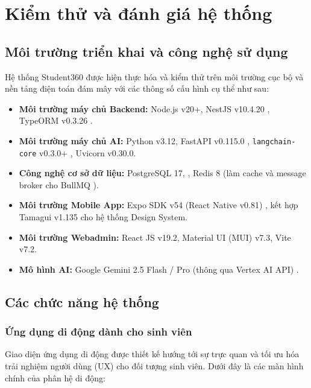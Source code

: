 \chapter{Kiểm thử và đánh giá hệ thống}
\label{ch:hien-thuc-kiem-thu-danh-gia}
\section{Môi trường triển khai và công nghệ sử dụng}
Hệ thống Student360 được hiện thực hóa và kiểm thử trên môi trường cục bộ và nền tảng điện toán đám mây với các thông số cấu hình cụ thể như sau:
\begin{sloppypar}
\begin{itemize}
    \item \textbf{Môi trường máy chủ Backend:} Node.js v20+, NestJS v10.4.20 \cite{nestjs-docs}, TypeORM v0.3.26 \cite{typeorm-docs}.
    \item \textbf{Môi trường máy chủ AI:} Python v3.12, FastAPI v0.115.0 \cite{fastapi-docs}, \texttt{langchain-core} v0.3.0+ \cite{langchain-docs}, Uvicorn v0.30.0.
    \item \textbf{Công nghệ cơ sở dữ liệu:} PostgreSQL 17, \cite{postgresql-docs}, Redis 8 \cite{redis-docs} (làm cache và message broker cho BullMQ \cite{bullmq-docs}).
    \item \textbf{Môi trường Mobile App:} Expo SDK v54 (React Native v0.81) \cite{reactnative-expo}, kết hợp Tamagui v1.135 cho hệ thống Design System.
    \item \textbf{Môi trường Webadmin:} React JS v19.2, Material UI (MUI) v7.3, Vite v7.2.
    \item \textbf{Mô hình AI:} Google Gemini 2.5 Flash / Pro (thông qua Vertex AI API) \cite{gemini-api}.
\end{itemize}
\end{sloppypar}

\section{Các chức năng hệ thống}
\subsection{Ứng dụng di động dành cho sinh viên}
Giao diện ứng dụng di động được thiết kế hướng tới sự trực quan và tối ưu hóa trải nghiệm người dùng (UX) cho đối tượng sinh viên. Dưới đây là các màn hình chính của phân hệ di động:

